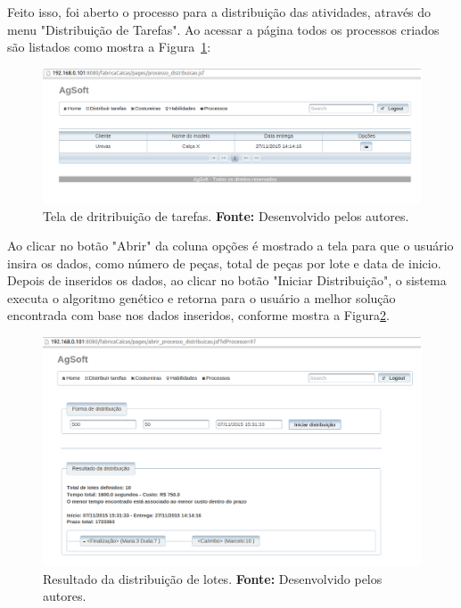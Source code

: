 \par Feito isso, foi aberto o processo para a distribuição
das atividades, através do menu "Distribuição de Tarefas".
Ao acessar a página todos os processos criados são
listados como mostra a Figura~\ref{fig:distribuicao_tarefas}:

\begin{figure}[h!]
	\centerline{\includegraphics[scale=0.3]{./imagens/tela_distribuicao_tarefas.png}}
	\caption[Tela de distribuição de tarefas.]
	{Tela de dritribuição de tarefas. \textbf{Fonte:} Desenvolvido
	pelos autores.}
	\label{fig:distribuicao_tarefas}
\end{figure}


\par Ao clicar no botão "Abrir" da coluna opções é mostrado a tela para que o
usuário insira os dados, como número de peças, total de peças por lote e data de inicio. Depois de
inseridos os dados, ao clicar no botão "Iniciar Distribuição", o sistema executa
o algoritmo genético e retorna para o usuário a melhor solução
encontrada com base nos dados inseridos, conforme mostra a Figura\ref{fig:resultado_distribuicao_teste1}.

\newpage

\begin{figure}[h!]
	\centerline{\includegraphics[scale=0.3]{./imagens/resultado_distribuicao_teste1.png}}
	\caption[Resultado da distribuição de lotes.]
	{Resultado da distribuição de lotes. \textbf{Fonte:} Desenvolvido pelos
	autores.}
	\label{fig:resultado_distribuicao_teste1}
\end{figure}

